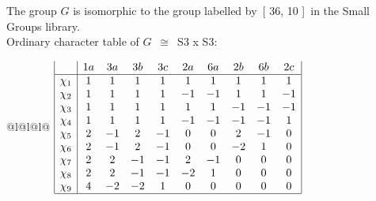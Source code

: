 \documentclass[varwidth=\maxdimen,border=10]{standalone}
\begin{document}
The group $G$ is isomorphic to the group labelled by\ [ 36, 10 ]\ in the Small Groups library.\\
Ordinary character table of $G$\ $\cong$\ S3 x S3:\\
\begin{center}
\begin{tabular}{@{}l@{}l@{}l@{}}
\hline
\(\begin{array}{|l|ccccccccc|}
  & 1a & 3a & 3b & 3c & 2a & 6a & 2b & 6b & 2c\\ \hline
\chi_{1} & 1 & 1 & 1 & 1 & 1 & 1 & 1 & 1 & 1\\
\chi_{2} & 1 & 1 & 1 & 1 & -1 & -1 & 1 & 1 & -1\\
\chi_{3} & 1 & 1 & 1 & 1 & 1 & 1 & -1 & -1 & -1\\
\chi_{4} & 1 & 1 & 1 & 1 & -1 & -1 & -1 & -1 & 1\\
\chi_{5} & 2 & -1 & 2 & -1 & 0 & 0 & 2 & -1 & 0\\
\chi_{6} & 2 & -1 & 2 & -1 & 0 & 0 & -2 & 1 & 0\\
\chi_{7} & 2 & 2 & -1 & -1 & 2 & -1 & 0 & 0 & 0\\
\chi_{8} & 2 & 2 & -1 & -1 & -2 & 1 & 0 & 0 & 0\\
\chi_{9} & 4 & -2 & -2 & 1 & 0 & 0 & 0 & 0 & 0\\
\hline
\end{array}\)\\
\end{tabular}
\end{center}
\end{document}
